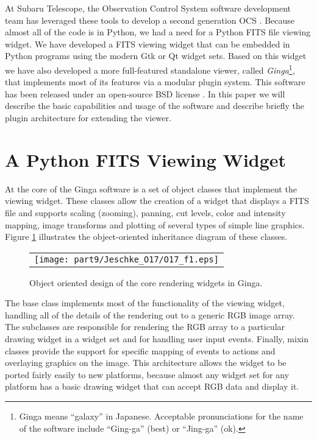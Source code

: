 At Subaru Telescope, the Observation Control System software development team has leveraged these tools to develop a second generation OCS \citep{Jeschke10B}. Because almost all of the code is in Python, we had a need for a Python FITS file viewing widget.  We have developed a FITS viewing widget that can be embedded in Python programs using the modern Gtk or Qt widget sets. Based on this widget we have also developed a more full-featured standalone viewer, called \emph{Ginga}\footnote{Ginga means ``galaxy'' in Japanese. Acceptable pronunciations for the name of the software include ``Ging-ga'' (best) or ``Jing-ga'' (ok).}, that implements most of its features via a modular plugin system. This software has been released under an open-source BSD license \citep{Jeschke12}. In this paper we will describe the basic capabilities and usage of the software and describe briefly the plugin architecture for extending the viewer.

\section{A Python FITS Viewing Widget}
At the core of the Ginga software is a set of object classes that implement the viewing widget.  These classes allow the creation of a widget that displays a FITS file and supports scaling (zooming), panning, cut levels, color and intensity mapping, image transforms and plotting of several types of simple line graphics. Figure \ref{fig:onion} illustrates the object-oriented inheritance diagram of these classes.
\label{sec:coreclasses}
\begin{figure}
  \begin{center}
    \begin{tabular}{c}
      \texttt{[image: part9/Jeschke\_O17/O17\_f1.eps]}
    \end{tabular}
  \end{center}
  \caption[example] 
          { \label{fig:onion} 
            Object oriented design of the core rendering widgets in Ginga.} 
\end{figure} 
The base class implements most of the functionality of the viewing widget, handling all of the details of the rendering out to a generic RGB image array. The subclasses are responsible for rendering the RGB array to a particular drawing widget in a widget set and for handling user input events. Finally, mixin classes \citep{mixins} provide the support for specific mapping of events to actions and overlaying graphics on the image. This architecture allows the widget to be ported fairly easily to new platforms, because almost any widget set for any platform has a basic drawing widget that can accept RGB data and display it.

